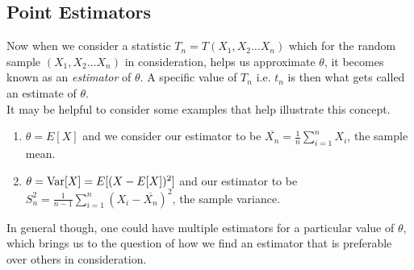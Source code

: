 \documentclass[12pt]{book}
\theoremstyle{definition}
\begin{document}
\subsection{Point Estimators}
Now when we consider a statistic $T_n = T(X_1, X_2 \ldots X_n)$ which for the random sample $(X_1, X_2 \ldots X_n)$ in consideration, helps us approximate $\theta$, it becomes known as an \textit{estimator} of $\theta$. A specific value of $T_n$ i.e. $t_n$ is then what gets called an estimate of $\theta$.\\
It may be helpful to consider some examples that help illustrate this concept.
\begin{enumerate}
    \item $\theta = E[X]$ and we consider our estimator to be $\overline{X_n} = \frac{1}{n} \sum_{i=1}^n X_i$, the sample mean.
    \item $\theta = \textnormal{Var}[X] = E[(X - E[X])^2]$ and our estimator to be\\ $S_n^2 = \frac{1}{n-1} \sum_{i=1}^n (X_i - \overline{X_n})^2$, the sample variance.
\end{enumerate}
In general though, one could have multiple estimators for a particular value of $\theta$, which brings us to the question of how we find an estimator that is preferable over others in consideration.
\end{document}
